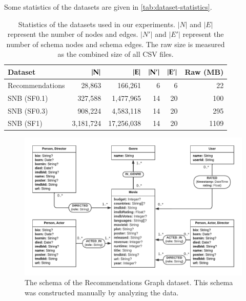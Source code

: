\documentclass{report}
\theoremstyle{definition}
\begin{document}
Some statistics of the datasets are given in \autoref{tab:dataset-statistics}.

\begin{table}[t]
  \centering
  \begin{tabular}{lrrrrr}
    \hline
    \textbf{Dataset} & $\bf{|N|}$ & $\bf{|E|}$ & $\bf{|N'|}$ & $\bf{|E'|}$ & \textbf{Raw (MB)} \\
    \hline
    Recommendations  & 28,863     & 166,261    & 6           & 6           & 22                \\
    SNB (SF0.1)      & 327,588    & 1,477,965  & 14          & 20          & 100               \\
    SNB (SF0.3)      & 908,224    & 4,583,118  & 14          & 20          & 295               \\
    SNB (SF1)        & 3,181,724  & 17,256,038 & 14          & 20          & 1109              \\
    \hline
  \end{tabular}
  \caption[Statistics of the datasets used in our experiments]{Statistics of the datasets used in our experiments. $|N|$ and $|E|$ represent the number of nodes and edges. $|N'|$ and $|E'|$ represent the number of schema nodes and schema edges. The raw size is measured as the combined size of all CSV files.}
  \label{tab:dataset-statistics}
\end{table}

\begin{figure}[t]
  \centering
  \includegraphics[width=\textwidth]{figures/schema-recommendations.pdf}
  \caption[The schema of the Recommendations Graph dataset]{The schema of the Recommendations Graph dataset. This schema was constructed manually by analyzing the data.}
  \label{fig:schema-recommendations}
\end{figure}
\end{document}
